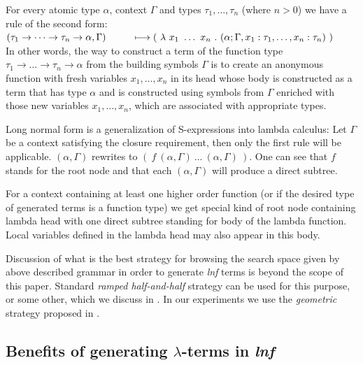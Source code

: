 \documentclass{sig-alternate}
\newcommand{\lterms}{$\lambda$-terms\xspace}
\newcommand{\lnf}{\textit{lnf}\xspace}
\newcommand{\ar}{\rightarrow\xspace}
\newcommand{\gar}{\longmapsto}
\begin{document}
For every atomic type $\alpha$, context $\Gamma$ and types
$\tau_1 , \dots , \tau_n$ (where $n > 0$) 
we have a rule of the second form:\\

$
( \tau_1 \ar \dots \ar \tau_n \ar \alpha , \Gamma )  
 \\ ~~~~~~~~\gar
(~\lambda~x_1~\dots~x_n~.~
( \alpha ; \Gamma , x_1:\tau_1 , \dots , x_n:\tau_n  )~)
$~\\

In other words, the way to construct a term of 
the function type $\tau_1 \ar \dots \ar \tau_n \ar \alpha$ 
from the building symbols $\Gamma$
is to create an anonymous function
with fresh variables $x_1, \dots , x_n$ in its head 
whose body is constructed as a term that has type $\alpha$
and is constructed using symbols from $\Gamma$ 
enriched with those new variables $x_1, \dots , x_n$,
which are associated with appropriate types.
  


Long normal form is a generalization of S-expressions into lambda calculus:
Let $\Gamma$ be a context satisfying the closure requirement, then only
the first rule will be applicable. 
$(\alpha, \Gamma)$ rewrites to $(~f~( \alpha, \Gamma )~\dots~( \alpha, \Gamma )~)$.
One can see that $f$ stands for 
the root node and that each $( \alpha , \Gamma )$ will produce a direct subtree. 

For a context containing at least one higher order function 
(or if the desired type of generated terms is a function type) we get special kind of root node containing lambda head with one direct subtree standing for body of the lambda function. Local variables defined in the lambda head may also appear in this body. 


Discussion of what is the best strategy for browsing the search space given by above described grammar in order to generate \lnf terms is beyond the scope of this paper. Standard \textit{ramped half-and-half} strategy can be used for this purpose, or some other, 
which we discuss in \cite{nasecec}. In our experiments we use the \textit{geometric} strategy proposed in 
\cite{nasecec}.


\subsection{Benefits of generating \lterms in \lnf}
\label{benefits}
\end{document}

